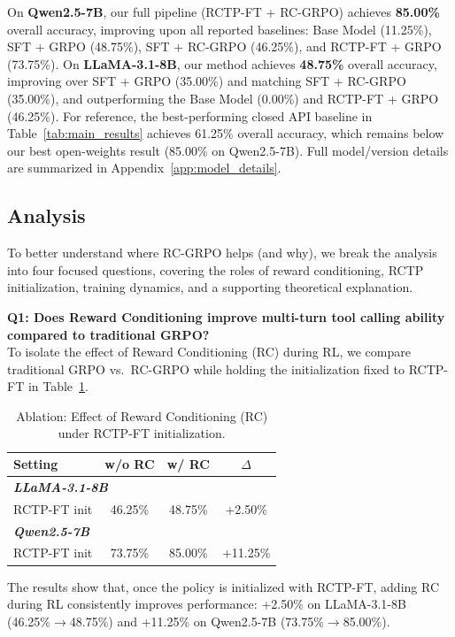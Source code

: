 \documentclass{article}
\theoremstyle{plain}
\theoremstyle{definition}
\theoremstyle{remark}
\begin{document}
On \textbf{Qwen2.5-7B}, our full pipeline (RCTP-FT + RC-GRPO) achieves \textbf{85.00\%} overall accuracy, improving upon all reported baselines: Base Model (11.25\%), SFT + GRPO (48.75\%), SFT + RC-GRPO (46.25\%), and RCTP-FT + GRPO (73.75\%).
On \textbf{LLaMA-3.1-8B}, our method achieves \textbf{48.75\%} overall accuracy, improving over SFT + GRPO (35.00\%) and matching SFT + RC-GRPO (35.00\%), and outperforming the Base Model (0.00\%) and RCTP-FT + GRPO (46.25\%).
For reference, the best-performing closed API baseline in Table~\ref{tab:main_results} achieves 61.25\% overall accuracy, which remains below our best open-weights result (85.00\% on Qwen2.5-7B).
Full model/version details are summarized in Appendix~\ref{app:model_details}.

\subsection{Analysis}
To better understand where RC-GRPO helps (and why), we break the analysis into four focused questions, covering the roles of reward conditioning, RCTP initialization, training dynamics, and a supporting theoretical explanation.

\textbf{Q1: Does Reward Conditioning improve multi-turn tool calling ability compared to traditional GRPO?} \\
To isolate the effect of Reward Conditioning (RC) during RL, we compare traditional GRPO vs.\ RC-GRPO while holding the initialization fixed to RCTP-FT in Table~\ref{tab:ablation_rc}.

\begin{table}[ht]
\centering
\caption{Ablation: Effect of Reward Conditioning (RC) under RCTP-FT initialization.}
\label{tab:ablation_rc}
\small
\begin{tabular*}{\columnwidth}{@{\extracolsep{\fill}}lccc}
\toprule
\textbf{Setting} & \textbf{w/o RC} & \textbf{w/ RC} & \textbf{$\Delta$} \\
\midrule
\multicolumn{4}{l}{\textit{\textbf{LLaMA-3.1-8B}}} \\
RCTP-FT init & 46.25\% & 48.75\% & +2.50\% \\
\midrule
\multicolumn{4}{l}{\textit{\textbf{Qwen2.5-7B}}} \\
RCTP-FT init & 73.75\% & 85.00\% & +11.25\% \\
\bottomrule
\end{tabular*}
\end{table}

The results show that, once the policy is initialized with RCTP-FT, adding RC during RL consistently improves performance: +2.50\% on LLaMA-3.1-8B (46.25\%$\to$48.75\%) and +11.25\% on Qwen2.5-7B (73.75\%$\to$85.00\%).
\end{document}
